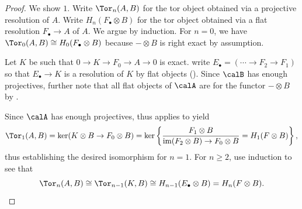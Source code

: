 \begin{proof}

    We show $1$. Write $\Tor_n(A,B)$ for the tor object obtained via a projective resolution of $A$. Write $H_n(F_\bullet \otimes B)$ for the tor object obtained via a flat resolution $F_\bullet \to A$ of $A$. We argue by induction. For $n = 0$, we have $\Tor_0(A,B) \cong H_0(F_\bullet \otimes B)$ because $- \otimes B$ is right exact by assumption. 
   
    Let $K$ be such that $0 \to K \to F_0 \to A \to 0$ is exact. write $E_\bullet = (\cdots \to F_2 \to F_1)$ so that $E_\bullet \to K$ is a resolution of $K$ by flat objects (). 
    Since $\calB$ has enough projectives, further note that all flat objects of $\calA$ are  for the functor $- \otimes B$ by .
    
    Since $\calA$ has enough projectives,  thus applies to yield
    $$\Tor_1(A,B) = \ker(K \otimes B \to F_0 \otimes B) = \ker \left\{ \frac{F_1 \otimes B}{\operatorname{im}(F_2 \otimes B) \to F_0 \otimes B} = H_1(F \otimes B)  \right\},$$
    thus establishing the desired isomorphism for $n = 1$. For $n \geq 2$, use induction to see that 
    $$\Tor_n(A,B) \cong \Tor_{n-1}(K, B) \cong H_{n-1}(E_\bullet \otimes B) = H_n(F \otimes B).$$

\end{proof}